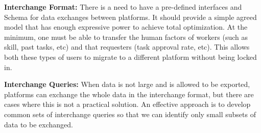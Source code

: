 \textbf{Interchange Format:} There is a need to have a pre-defined interfaces and Schema for data
exchanges between platforms. It should provide a simple agreed model that has enough
expressive power to achieve total optimization. 
At the minimum, one must be able to transfer the human factors of workers (such as skill, past tasks, etc)
and that requesters (task approval rate, etc). 
This allows both these types of users to migrate to a different platform without being locked in. 

\textbf{Interchange Queries:} When data is not large and is allowed to be exported, platforms can exchange the whole data in the interchange format,
but there are cases where this is not a practical solution. An effective approach is to  develop common sets of interchange queries so that we can identify only small subsets of data to be exchanged.



